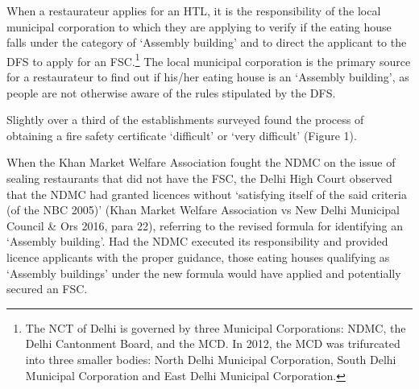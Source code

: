 \documentclass[a4paper, 12pt]{article}
\begin{document}
		When a restaurateur applies for an HTL, it is the responsibility of the local municipal corporation to which they are applying to verify if the eating house falls under the category of ‘Assembly building’ and to direct the applicant to the DFS to apply for an 
FSC.\footnote{The NCT of Delhi is governed by three Municipal Corporations: NDMC, the Delhi Cantonment Board, and the MCD. In 2012, the MCD was trifurcated into three smaller bodies: North Delhi Municipal Corporation, South Delhi Municipal Corporation 
and East Delhi Municipal Corporation.} The local municipal corporation is the primary source for a restaurateur to find out if his/her eating house is an ‘Assembly building’, as people are not otherwise aware of the rules stipulated by the DFS. %
		
		Slightly over a third of the establishments surveyed found the process of obtaining a fire safety certificate ‘difficult’ or ‘very difficult’ (Figure 1). 
		
		When the Khan Market Welfare Association fought the NDMC on the issue of sealing restaurants that did not have the FSC, the Delhi High Court observed that the NDMC had granted licences without ‘satisfying itself of the said criteria (of the NBC 
2005)’ (Khan Market Welfare Association vs New Delhi Municipal Council \& Ors 2016, para 22), referring to the revised formula for identifying an ‘Assembly building’. Had the NDMC executed its responsibility and provided licence applicants with the proper 
guidance, those eating houses qualifying as ‘Assembly buildings’ under the new formula would have applied and potentially secured an FSC.%
		
     
                  
\end{document}

